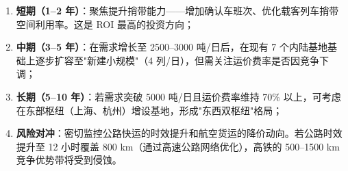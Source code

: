 \documentclass[12pt,a4paper,fontset=none]{ctexart}
\begin{document}
\begin{enumerate}[leftmargin=*]
    \item \textbf{短期（1--2 年）}：聚焦提升捎带能力——增加确认车班次、优化载客列车捎带空间利用率。这是 ROI 最高的投资方向；
    \item \textbf{中期（3--5 年）}：在需求增长至 2500--3000 吨/日后，在现有 7 个内陆基地基础上逐步扩容至"新建小规模"（4 列/日），但需关注运价费率是否因竞争下调；
    \item \textbf{长期（5--10 年）}：若需求突破 5000 吨/日且运价费率维持 70\% 以上，可考虑在东部枢纽（上海、杭州）增设基地，形成"东西双枢纽"格局；
    \item \textbf{风险对冲}：密切监控公路快运的时效提升和航空货运的降价动向。若公路时效提升至 12 小时覆盖 800 km（通过高速公路网络优化），高铁的 500--1500 km 竞争优势带将受到侵蚀。
\end{enumerate}
\end{document}
